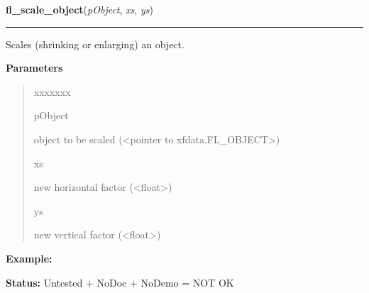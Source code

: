 \hspace{.8\funcindent}\begin{boxedminipage}{\funcwidth}

    \raggedright \textbf{fl\_scale\_object}(\textit{pObject}, \textit{xs}, \textit{ys})

    \vspace{-1.5ex}

    \rule{\textwidth}{0.5\fboxrule}
\setlength{\parskip}{2ex}
    Scales (shrinking or enlarging) an object.

\setlength{\parskip}{1ex}
      \textbf{Parameters}
      \vspace{-1ex}

      \begin{quote}
        \begin{Ventry}{xxxxxxx}

          \item[pObject]

          object to be scaled ({\textless}pointer to 
          xfdata.FL\_OBJECT{\textgreater})

          \item[xs]

          new horizontal factor ({\textless}float{\textgreater})

          \item[ys]

          new vertical factor ({\textless}float{\textgreater})

        \end{Ventry}

      \end{quote}

\textbf{Example:} 

\textbf{Status:} Untested + NoDoc + NoDemo = NOT OK



    \end{boxedminipage}

    \label{xformslib:library:fl_show_object}

    \vspace{0.5ex}

